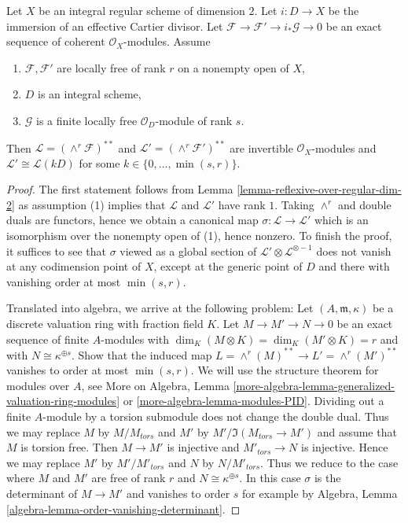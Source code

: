 \begin{lemma}
\label{lemma-wedge-product-ses}
Let $X$ be an integral regular scheme of dimension $2$.
Let $i : D \to X$ be the immersion of an effective Cartier divisor.
Let $\mathcal{F} \to \mathcal{F}' \to i_*\mathcal{G} \to 0$
be an exact sequence of coherent $\mathcal{O}_X$-modules.
Assume
\begin{enumerate}
\item $\mathcal{F}, \mathcal{F}'$ are locally free of rank $r$ on a nonempty
open of $X$,
\item $D$ is an integral scheme,
\item $\mathcal{G}$ is a finite locally free $\mathcal{O}_D$-module
of rank $s$.
\end{enumerate}
Then $\mathcal{L} = (\wedge^r\mathcal{F})^{**}$ and
$\mathcal{L}' = (\wedge^r \mathcal{F}')^{**}$
are invertible $\mathcal{O}_X$-modules and
$\mathcal{L}' \cong \mathcal{L}(k D)$ for some
$k \in \{0, \ldots, \min(s, r)\}$.
\end{lemma}

\begin{proof}
The first statement follows from Lemma \ref{lemma-reflexive-over-regular-dim-2}
as assumption (1) implies that $\mathcal{L}$ and $\mathcal{L}'$
have rank $1$. Taking $\wedge^r$ and double duals are functors, hence
we obtain a canonical map $\sigma : \mathcal{L} \to \mathcal{L}'$
which is an isomorphism over the nonempty open of (1), hence
nonzero. To finish the proof, it suffices to see that
$\sigma$ viewed as a global section of
$\mathcal{L}' \otimes \mathcal{L}^{\otimes -1}$ does not
vanish at any codimension point of $X$, except at the generic
point of $D$ and there with vanishing order at most $\min(s, r)$.

\medskip\noindent
Translated into algebra, we arrive at the following problem:
Let $(A, \mathfrak m, \kappa)$ be a discrete valuation ring
with fraction field $K$. Let $M \to M' \to N \to 0$ be an exact sequence
of finite $A$-modules with $\dim_K(M \otimes K) = \dim_K(M' \otimes K) = r$
and with $N \cong \kappa^{\oplus s}$. Show that the induced map
$L = \wedge^r(M)^{**} \to L' = \wedge^r(M')^{**}$ vanishes to
order at most $\min(s, r)$. We will use the structure theorem for
modules over $A$, see
More on Algebra, Lemma
\ref{more-algebra-lemma-generalized-valuation-ring-modules} or
\ref{more-algebra-lemma-modules-PID}.
Dividing out a finite $A$-module by a torsion submodule does not
change the double dual.
Thus we may replace $M$ by $M/M_{tors}$ and $M'$ by
$M'/\Im(M_{tors} \to M')$ and assume that $M$ is torsion free.
Then $M \to M'$ is injective and $M'_{tors} \to N$ is injective.
Hence we may replace $M'$ by $M'/M'_{tors}$ and $N$ by $N/M'_{tors}$.
Thus we reduce to the case where $M$ and $M'$ are free of rank $r$
and $N \cong \kappa^{\oplus s}$. In this case $\sigma$
is the determinant of $M \to M'$ and vanishes to order $s$
for example by Algebra, Lemma \ref{algebra-lemma-order-vanishing-determinant}.
\end{proof}









